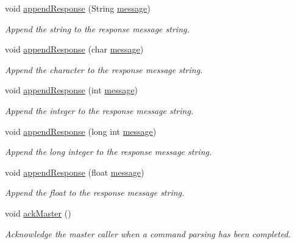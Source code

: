 \begin{DoxyCompactItemize}
void \hyperlink{_meditech___chip_kit_control_panel_8pde_afffcc2cca703b7a4d76c7f2dedd7266d}{append\-Response} (String \hyperlink{_meditech___chip_kit_control_panel_8pde_ae1956b5b6310b3339e72931911b84e3f}{message})
\begin{DoxyCompactList}\small\item\em Append the string to the response message string. \end{DoxyCompactList}\item 
void \hyperlink{_meditech___chip_kit_control_panel_8pde_ab4a96ab750b61d7410c41283cf17bac5}{append\-Response} (char \hyperlink{_meditech___chip_kit_control_panel_8pde_ae1956b5b6310b3339e72931911b84e3f}{message})
\begin{DoxyCompactList}\small\item\em Append the character to the response message string. \end{DoxyCompactList}\item 
void \hyperlink{_meditech___chip_kit_control_panel_8pde_a4d7e4234d7256ea1f3cca5fd420c84da}{append\-Response} (int \hyperlink{_meditech___chip_kit_control_panel_8pde_ae1956b5b6310b3339e72931911b84e3f}{message})
\begin{DoxyCompactList}\small\item\em Append the integer to the response message string. \end{DoxyCompactList}\item 
void \hyperlink{_meditech___chip_kit_control_panel_8pde_a26e2576348920e813fa803510e0a6d24}{append\-Response} (long int \hyperlink{_meditech___chip_kit_control_panel_8pde_ae1956b5b6310b3339e72931911b84e3f}{message})
\begin{DoxyCompactList}\small\item\em Append the long integer to the response message string. \end{DoxyCompactList}\item 
void \hyperlink{_meditech___chip_kit_control_panel_8pde_aaf26af1780165c4f85c952760a7b5c3d}{append\-Response} (float \hyperlink{_meditech___chip_kit_control_panel_8pde_ae1956b5b6310b3339e72931911b84e3f}{message})
\begin{DoxyCompactList}\small\item\em Append the float to the response message string. \end{DoxyCompactList}\item 
void \hyperlink{_meditech___chip_kit_control_panel_8pde_a4e435af9ec30d668c4cff6a97baa8e5a}{ack\-Master} ()
\begin{DoxyCompactList}\small\item\em Acknowledge the master caller when a command parsing has been completed. \end{DoxyCompactList}\item 

\end{DoxyCompactItemize}

